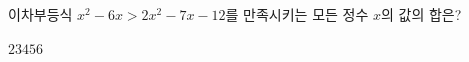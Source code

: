 이차부등식 $x^2-6x>2x^2-7x-12$를 만족시키는 모든 정수 $x$의 값의 합은?
\begin{choices32}{$2$}{$3$}{$4$}{$5$}{$6$}\end{choices32}
